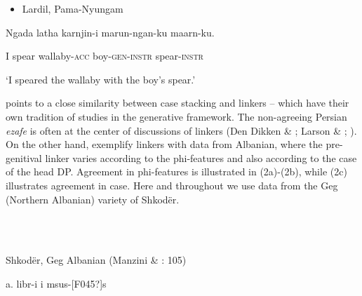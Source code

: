 \documentclass[output=paper]{langsci/langscibook}
\begin{document}
\begin{itemize}
\item \begin{styleSfondomedioiColorexxi}
Lardil, Pama-Nyungam \citep[43]{Richards2013}
\end{styleSfondomedioiColorexxi}\end{itemize}
\begin{styleSfondomedioiColorexxi}
Ngada latha   karnjin-i   marun-ngan-ku   maarn-ku.   
\end{styleSfondomedioiColorexxi}

\begin{styleSfondomedioiColorexxi}
I   spear   wallaby-\textsc{acc} boy-\textsc{gen-instr}  spear-\textsc{instr}
\end{styleSfondomedioiColorexxi}

\begin{styleSfondomedioiColorexxi}
‘I speared the wallaby with the boy’s spear.’        
\end{styleSfondomedioiColorexxi}

\begin{styleSfondomedioiColorexxi}
\citet{Plank1995} points to a close similarity between case stacking and linkers – which have their own tradition of studies in the generative framework. The non-agreeing Persian \textit{ezafe} is often at the center of discussions of linkers (Den Dikken \& \citealt{Singhapreecha2004}; Larson \& \citealt{Yamakido2008}; \citealt{Richards2010}). On the other hand, \citet{FrancoEtAl2015} exemplify linkers with data from Albanian, where the pre-genitival linker varies according to the phi-features and also according to the case of the head DP. Agreement in phi-features is illustrated in (2a)-(2b), while (2c) illustrates agreement in case. Here and throughout we use data from the Geg (Northern Albanian) variety of Shkodër.
\end{styleSfondomedioiColorexxi}

\begin{styleSfondomedioiColorexxi}
\ea%
    \label{ex:key:2}
    \gll\\
        \\
    \glt
    \z

          Shkodër, Geg Albanian  (Manzini \& \citealt{Savoia2011b}: 105)
\end{styleSfondomedioiColorexxi}

\begin{styleSfondomedioiColorexxi}
a.  libr-i          i       msus-[F045?]s   
\end{styleSfondomedioiColorexxi}
\end{document}
